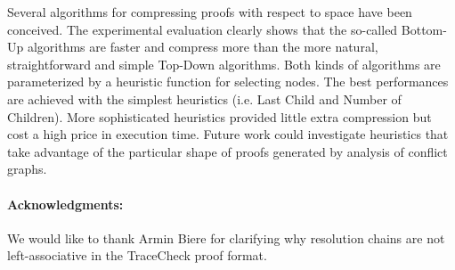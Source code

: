 Several algorithms for compressing proofs with respect to space have been conceived. The experimental evaluation clearly shows that the so-called Bottom-Up algorithms are faster and compress more than the more natural, straightforward and simple Top-Down algorithms. Both kinds of algorithms are parameterized by a heuristic function for selecting nodes. The best performances are achieved with the simplest heuristics (i.e. Last Child and Number of Children). More sophisticated heuristics provided little extra compression but cost a high price in execution time. Future work could investigate heuristics that take advantage of the particular shape of proofs generated by analysis of conflict graphs.

\vspace{-5pt}
\paragraph{Acknowledgments:} We would like to thank Armin Biere for clarifying why resolution chains are not left-associative in the TraceCheck proof format.

\vspace{-5pt}

